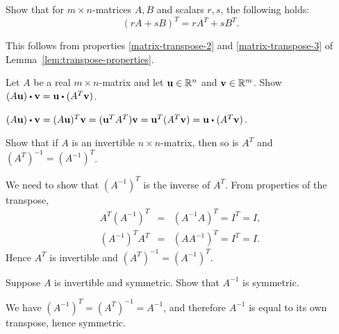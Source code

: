 \begin{ex}
  Show that for $m \times n$-matrices $A,B$ and scalars $r, s$, the
  following holds:
  \begin{equation*}
    (rA + sB)^T = rA^T + sB^T.
  \end{equation*}
  \vspace{-4ex}
  \begin{sol}
    This follows from properties {\ref{matrix-transpose-2}} and
    {\ref{matrix-transpose-3}} of
    Lemma~\ref{lem:transpose-properties}.
  \end{sol}
\end{ex}

\begin{ex} \label{exer-Rn3}  Let $A$ be a real $m\times n$-matrix and
  let $\vect{u}\in \R^n$ and $\vect{v}\in \R^m$. Show
  $(A\vect{u})\dotprod \vect{v}=\vect{u}\dotprod (A^T\vect{v})$.
  \begin{sol}
    $(A\vect{u})\dotprod \vect{v} = (A\vect{u})^T\vect{v} =
    (\vect{u}^TA^T)\vect{v}  = \vect{u}^T(A^T\vect{v}) =
    \vect{u}\dotprod (A^T\vect{v})$.
  \end{sol}
\end{ex}

\begin{ex}
  Show that if $A$ is an invertible $n\times n$-matrix, then so is
  $A^T$ and $(A^T)^{-1}=(A^{-1})^T$.
  \begin{sol}
    We need to show that $(A^{-1})^T$ is the inverse of
    $A^T$. From properties of the transpose,
    \begin{eqnarray*}
      A^T(A^{-1})^T &=& (A^{-1}A)^T=I^T=I, \\
      (A^{-1})^TA^T &=& (AA^{-1})^T=I^T=I.
    \end{eqnarray*}
    Hence $A^T$ is invertible and $(A^T)^{-1}=(A^{-1})^T$.
  \end{sol}
\end{ex}

\begin{ex}
  Suppose $A$ is invertible and symmetric. Show that $A^{-1}$ is
  symmetric.
  \begin{sol}
    We have $(A^{-1})^T = (A^T)^{-1} = A^{-1}$, and therefore $A^{-1}$
    is equal to its own transpose, hence symmetric.
  \end{sol}
\end{ex}

